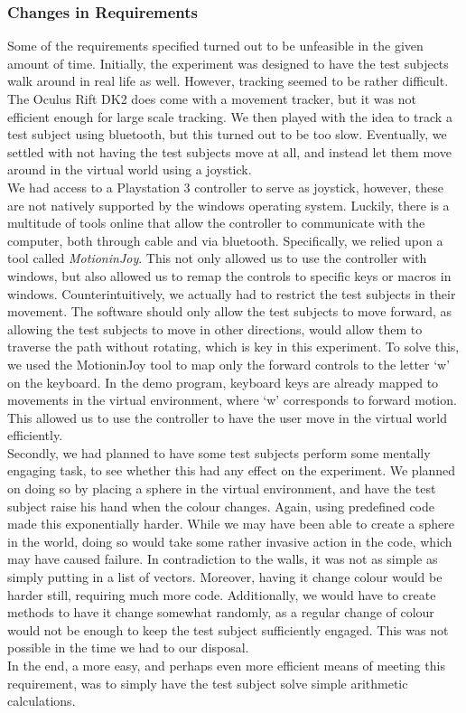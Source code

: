 \subsubsection{Changes in Requirements}
Some of the requirements specified turned out to be unfeasible in the given amount of time.
Initially, the experiment was designed to have the test subjects walk around in real life as well.
However, tracking seemed to be rather difficult.
The Oculus Rift DK2 does come with a movement tracker, but it was not efficient enough for large scale tracking.
We then played with the idea to track a test subject using bluetooth, but this turned out to be too slow.
Eventually, we settled with not having the test subjects move at all, and instead let them move around in the virtual world using a joystick. \\
We had access to a Playstation 3 controller to serve as joystick, however, these are not natively supported by the windows operating system.
Luckily, there is a multitude of tools online that allow the controller to communicate with the computer, both through cable and via bluetooth.
Specifically, we relied upon a tool called \textit{MotioninJoy}.
This not only allowed us to use the controller with windows, but also allowed us to remap the controls to specific keys or macros in windows.
Counterintuitively, we actually had to restrict the test subjects in their movement.
The software should only allow the test subjects to move forward, as allowing the test subjects to move in other directions, would allow them to traverse the path without rotating, which is key in this experiment.
To solve this, we used the MotioninJoy tool to map only the forward controls to the letter `w' on the keyboard.
In the demo program, keyboard keys are already mapped to movements in the virtual environment, where `w' corresponds to forward motion.
This allowed us to use the controller to have the user move in the virtual world efficiently. \\

Secondly, we had planned to have some test subjects perform some mentally engaging task, to see whether this had any effect on the experiment.
We planned on doing so by placing a sphere in the virtual environment, and have the test subject raise his hand when the colour changes.
Again, using predefined code made this exponentially harder.
While we may have been able to create a sphere in the world, doing so would take some rather invasive action in the code, which may have caused failure.
In contradiction to the walls, it was not as simple as simply putting in a list of vectors.
Moreover, having it change colour would be harder still, requiring much more code.
Additionally, we would have to create methods to have it change somewhat randomly, as a regular change of colour would not be enough to keep the test subject sufficiently engaged.
This was not possible in the time we had to our disposal. \\
In the end, a more easy, and perhaps even more efficient means of meeting this requirement, was to simply have the test subject solve simple arithmetic calculations. 
